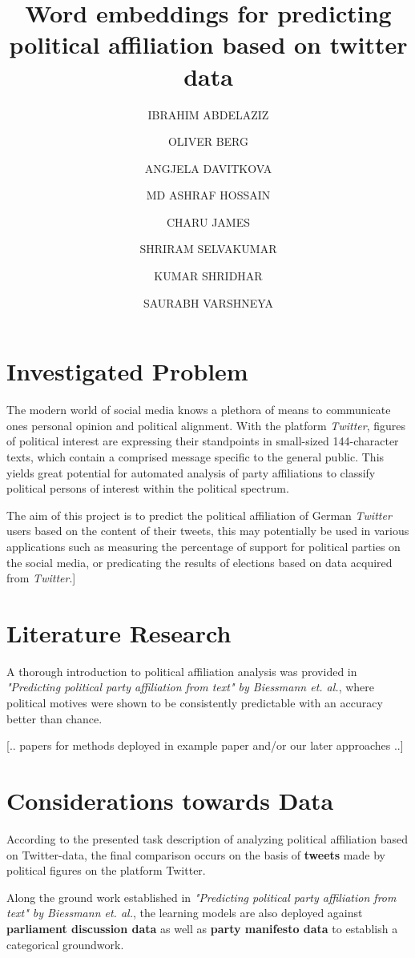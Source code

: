 \documentclass[10pt, oneside]{article}
\title{Word embeddings for predicting political affiliation based on twitter data}
\author[]{IBRAHIM ABDELAZIZ}
\author[]{OLIVER BERG}
\author[]{ANGJELA DAVITKOVA}
\author[]{MD ASHRAF HOSSAIN}
\author[]{CHARU JAMES}
\author[]{SHRIRAM SELVAKUMAR}
\author[]{KUMAR SHRIDHAR}
\author[]{SAURABH VARSHNEYA}
\affil[1]{Technische Universität Kaiserslautern}
\begin{document}
\maketitle



\section{Investigated Problem}

The modern world of social media knows a plethora of means to communicate ones personal opinion and political alignment. With the platform \textit{Twitter}, figures of political interest are expressing their standpoints in small-sized 144-character texts, which contain a comprised message specific to the general public. This yields great potential for automated analysis of party affiliations to classify political persons of interest within the political spectrum.

The aim of this project is to predict the political affiliation of German \textit{Twitter} users based on the content of their tweets, this may potentially be used in various applications such as measuring the percentage of support for political parties on the social media, or predicating  the results of elections based on data acquired from \textit{Twitter}.]


\section{Literature Research}

A thorough introduction to political affiliation analysis was provided in \textit{"Predicting political party affiliation from text" by Biessmann et. al.}, where political motives were shown to be consistently predictable with an accuracy better than chance. 

[.. papers for methods deployed in example paper and/or our later approaches ..]



\section{Considerations towards Data}

According to the presented task description of analyzing political affiliation based on Twitter-data, the final comparison occurs on the basis of \textbf{tweets} made by political figures on the platform Twitter.

Along the ground work established in \textit{"Predicting political party affiliation from text" by Biessmann et. al.}, the learning models are also deployed against \textbf{parliament discussion data} as well as \textbf{party manifesto data} to establish a categorical groundwork.
\end{document}

